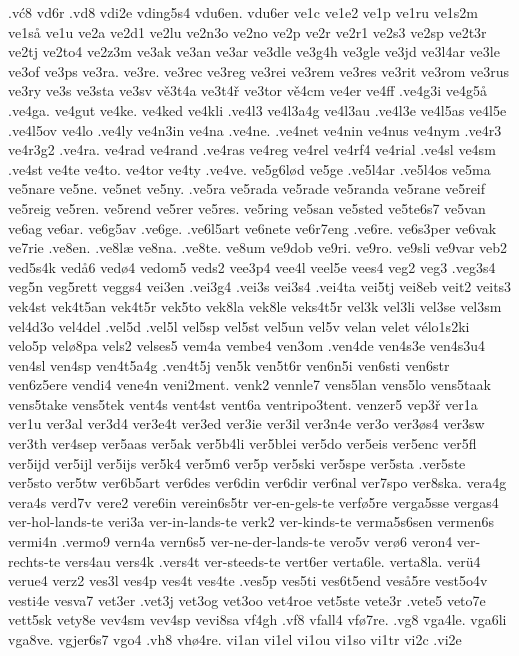 {{.vć8
vd6r
.vd8
vdi2e
vding5s4
vdu6en.
vdu6er
ve1c
ve1e2
ve1p
ve1ru
ve1s2m
ve1så
ve1u
ve2a
ve2d1
ve2lu
ve2n3o
ve2no
ve2p
ve2r
ve2r1
ve2s3
ve2sp
ve2t3r
ve2tj
ve2to4
ve2z3m
ve3ak
ve3an
ve3ar
ve3dle
ve3g4h
ve3gle
ve3jd
ve3l4ar
ve3le
ve3of
ve3ps
ve3ra.
ve3re.
ve3rec
ve3reg
ve3rei
ve3rem
ve3res
ve3rit
ve3rom
ve3rus
ve3ry
ve3s
ve3sta
ve3sv
vě3t4a
ve3t4ř
ve3tor
vě4cm
ve4er
ve4ff
.ve4g3i
ve4g5å
.ve4ga.
ve4gut
ve4ke.
ve4ked
ve4kli
.ve4l3
ve4l3a4g
ve4l3au
.ve4l3e
ve4l5as
ve4l5e
.ve4l5ov
ve4lo
.ve4ly
ve4n3in
ve4na
.ve4ne.
.ve4net
ve4nin
ve4nus
ve4nym
.ve4r3
ve4r3g2
.ve4ra.
ve4rad
ve4rand
.ve4ras
ve4reg
ve4rel
ve4rf4
ve4rial
.ve4sl
ve4sm
.ve4st
ve4te
ve4to.
ve4tor
ve4ty
.ve4ve.
ve5g6lød
ve5ge
.ve5l4ar
.ve5l4os
ve5ma
ve5nare
ve5ne.
ve5net
ve5ny.
.ve5ra
ve5rada
ve5rade
ve5randa
ve5rane
ve5reif
ve5reig
ve5ren.
ve5rend
ve5rer
ve5res.
ve5ring
ve5san
ve5sted
ve5te6s7
ve5van
ve6ag
ve6ar.
ve6g5av
.ve6ge.
.ve6l5art
ve6nete
ve6r7eng
.ve6re.
ve6s3per
ve6vak
ve7rie
.ve8en.
.ve8læ
ve8na.
.ve8te.
ve8um
ve9dob
ve9ri.
ve9ro.
ve9sli
ve9var
veb2
ved5s4k
vedå6
vedø4
vedom5
veds2
vee3p4
vee4l
veel5e
vees4
veg2
veg3
.veg3s4
veg5n
veg5rett
veggs4
vei3en
.vei3g4
.vei3s
vei3s4
.vei4ta
vei5tj
vei8eb
veit2
veits3
vek4st
vek4t5an
vek4t5r
vek5to
vek8la
vek8le
veks4t5r
vel3k
vel3li
vel3se
vel3sm
vel4d3o
vel4del
.vel5d
.vel5l
vel5sp
vel5st
vel5un
vel5v
velan
velet
vélo1s2ki
velo5p
velø8pa
vels2
velses5
vem4a
vembe4
ven3om
.ven4de
ven4s3e
ven4s3u4
ven4sl
ven4sp
ven4t5a4g
.ven4t5j
ven5k
ven5t6r
ven6n5i
ven6sti
ven6str
ven6z5ere
vendi4
vene4n
veni2ment.
venk2
vennle7
vens5lan
vens5lo
vens5taak
vens5take
vens5tek
vent4s
vent4st
vent6a
ventripo3tent.
venzer5
vep3ř
ver1a
ver1u
ver3al
ver3d4
ver3e4t
ver3ed
ver3ie
ver3il
ver3n4e
ver3o
ver3øs4
ver3sw
ver3th
ver4sep
ver5aas
ver5ak
ver5b4li
ver5blei
ver5do
ver5eis
ver5enc
ver5fl
ver5ijd
ver5ijl
ver5ijs
ver5k4
ver5m6
ver5p
ver5ski
ver5spe
ver5sta
.ver5ste
ver5sto
ver5tw
ver6b5art
ver6des
ver6din
ver6dir
ver6nal
ver7spo
ver8ska.
vera4g
vera4s
verd7v
vere2
vere6in
verein6s5tr
ver-en-gels-te
verfø5re
verga5sse
vergas4
ver-hol-lands-te
veri3a
ver-in-lands-te
verk2
ver-kinds-te
verma5s6sen
vermen6s
vermi4n
.vermo9
vern4a
vern6s5
ver-ne-der-lands-te
vero5v
verø6
veron4
ver-rechts-te
vers4au
vers4k
.vers4t
ver-steeds-te
vert6er
verta6le.
verta8la.
verü4
verue4
verz2
ves3l
ves4p
ves4t
ves4te
.ves5p
ves5ti
ves6t5end
veså5re
vest5o4v
vesti4e
vesva7
vet3er
.vet3j
vet3og
vet3oo
vet4roe
vet5ste
vete3r
.vete5
veto7e
vett5sk
vety8e
vev4sm
vev4sp
vevi8sa
vf4gh
.vf8
vfall4
vfø7re.
.vg8
vga4le.
vga6li
vga8ve.
vgjer6s7
vgo4
.vh8
vhø4re.
vi1an
vi1el
vi1ou
vi1so
vi1tr
vi2c
.vi2e
}}
